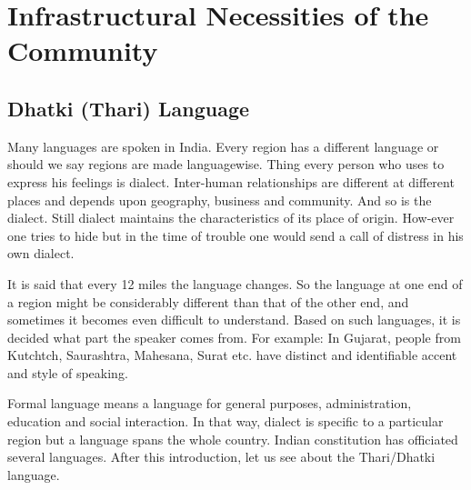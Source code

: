\chapter{Infrastructural Necessities of the Community}
\section{Dhatki (Thari) Language}
Many languages are spoken in India. Every region has a different language or
should we say regions are made languagewise. Thing every person who uses to
express his feelings is dialect. Inter-human relationships are different at
different places and depends upon geography, business and community. And so is
the dialect. Still dialect maintains the characteristics of its place of origin.
How-ever one tries to hide but in the time of trouble one would send a call of
distress in his own dialect.

It is said that every 12 miles the language changes. So the language at one end
of a region might be considerably different than that of the other end, and
sometimes it becomes even difficult to understand. Based on such languages, it
is decided what part the speaker comes from. For example: In Gujarat, people
from Kutchtch, Saurashtra, Mahesana, Surat etc. have distinct and identifiable
accent and style of speaking.

Formal language means a language for general purposes, administration, education
and social interaction. In that way, dialect is specific to a particular region
but a language spans the whole country. Indian constitution has officiated
several languages. After this introduction, let us see about the Thari/Dhatki
language.

